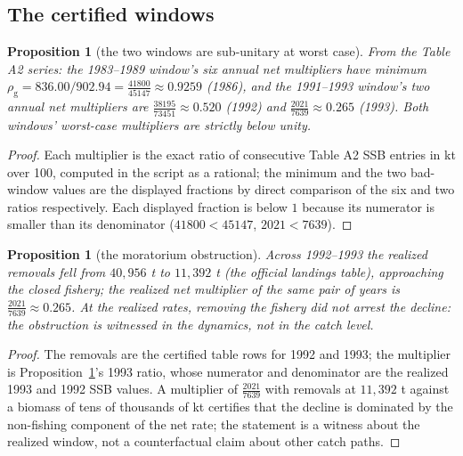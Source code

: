 \documentclass[10pt,twocolumn]{article}
\theoremstyle{plain}
\newtheorem{proposition}[theorem]{Proposition}
\theoremstyle{remark}
\begin{document}
\subsection{The certified windows}\label{windows}

\begin{proposition}[the two windows are sub-unitary at worst case]
\label{prop:windows}
From the Table A2 series: the 1983--1989 window's six annual net
multipliers have minimum \(\rho_{\mathrm{g}} = 836.00/902.94 =
\tfrac{41800}{45147} \approx 0.9259\) (1986), and the 1991--1993
window's two annual net multipliers are
\(\tfrac{38195}{73451} \approx 0.520\) (1992) and
\(\tfrac{2021}{7639} \approx 0.265\) (1993). Both windows' worst-case
multipliers are strictly below unity.
\end{proposition}

\begin{proof}
Each multiplier is the exact ratio of consecutive Table A2 SSB entries
in kt over 100, computed in the script as a rational; the minimum and
the two bad-window values are the displayed fractions by direct
comparison of the six and two ratios respectively. Each displayed
fraction is below \(1\) because its numerator is smaller than its
denominator (\(41800 < 45147\), \(2021 < 7639\)).
\end{proof}

\begin{proposition}[the moratorium obstruction]\label{prop:moratorium}
Across 1992--1993 the realized removals fell from \(40{,}956\) t to
\(11{,}392\) t (the official landings table), approaching the closed
fishery; the realized net multiplier of the same pair of years is
\(\tfrac{2021}{7639} \approx 0.265\). At the realized rates, removing
the fishery did not arrest the decline: the obstruction is witnessed in
the dynamics, not in the catch level.
\end{proposition}

\begin{proof}
The removals are the certified table rows for 1992 and 1993; the
multiplier is Proposition~\ref{prop:windows}'s 1993 ratio, whose
numerator and denominator are the realized 1993 and 1992 SSB values. A
multiplier of \(\tfrac{2021}{7639}\) with removals at \(11{,}392\) t
against a biomass of tens of thousands of kt certifies that the decline
is dominated by the non-fishing component of the net rate; the
statement is a witness about the realized window, not a counterfactual
claim about other catch paths.
\end{proof}
\end{document}
